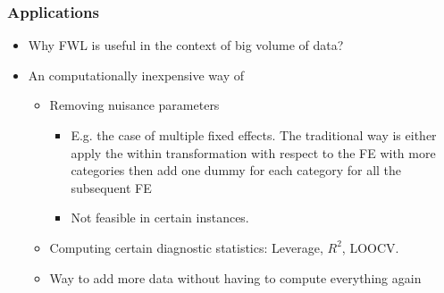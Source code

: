 \documentclass[
  shownotes,
  xcolor={svgnames},
  hyperref={colorlinks,citecolor=DarkBlue,linkcolor=DarkRed,urlcolor=DarkBlue}
  , aspectratio=169]{beamer}
\begin{document}
\begin{frame}
\frametitle{Applications}

\begin{itemize}


  \item Why FWL is useful in the context of big volume of data?
  \bigskip
  \item An computationally inexpensive way of
\begin{itemize}
  \medskip
  \item  Removing nuisance parameters
  \begin{itemize}
    \item E.g. the case of multiple fixed effects. The traditional way is either apply the within transformation with respect to the FE with more categories then add one dummy for each category for all the subsequent FE 
    \item Not feasible in certain instances. 
  \end{itemize}
  \medskip
  \item Computing certain diagnostic statistics: Leverage, $R^2$, LOOCV.
  \medskip
  \item Way to add more data without having to compute everything again

\end{itemize}

\end{itemize}

\end{frame}
\end{document}
